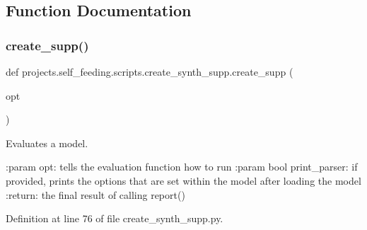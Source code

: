 \subsection{Function Documentation}
\mbox{\label{namespaceprojects_1_1self__feeding_1_1scripts_1_1create__synth__supp_a81cbb13896d9614507b68362e90d8f6c}} 
\subsubsection{\texorpdfstring{create\+\_\+supp()}{create\_supp()}}
{\footnotesize\ttfamily def projects.\+self\+\_\+feeding.\+scripts.\+create\+\_\+synth\+\_\+supp.\+create\+\_\+supp (\begin{DoxyParamCaption}\item[{}]{opt }\end{DoxyParamCaption})}

\begin{DoxyVerb}Evaluates a model.

:param opt: tells the evaluation function how to run
:param bool print_parser: if provided, prints the options that are set within the
    model after loading the model
:return: the final result of calling report()
\end{DoxyVerb}
 

Definition at line 76 of file create\+\_\+synth\+\_\+supp.\+py.


